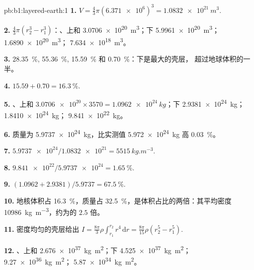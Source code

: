 \begin{solution}{pb:b1:layered-earth:1}
\textbf{1.} $V = \tfrac43\pi(\num{6.371e6})^3 = \qty{1.0832e21}{m^3}$.

\textbf{2.} $\tfrac43\pi(r_2^3 - r_1^3)$：、上和
\qty{3.0706e20}{m^3}；下 \qty{5.9961e20}{m^3}；
\qty{1.6890e20}{m^3}； \qty{7.634e18}{m^3}。

\textbf{3.} \qty{28.35}{\percent}, \qty{55.36}{\percent}, \qty{15.59}{\percent}
和 \qty{0.70}{\percent}：下是最大的壳层，
超过地球体积的一半。

\textbf{4.} $15.59 + 0.70 = \qty{16.3}{\percent}$.

\textbf{5.} 、上和 $\num{3.0706e20}\times3570 =
\qty{1.0962e24}{kg}$；下 \qty{2.9381e24}{kg}；
\qty{1.8410e24}{kg}； \qty{9.841e22}{kg}。

\textbf{6.} 质量为 \qty{5.9737e24}{kg}，比实测值
\qty{5.972e24}{kg} 高 \qty{0.03}{\percent}。

\textbf{7.} $\num{5.9737e24}/\num{1.0832e21} = \qty{5515}{kg.m^{-3}}$.

\textbf{8.} $\num{9.841e22}/\num{5.9737e24} = \qty{1.65}{\percent}$.

\textbf{9.} $(1.0962 + 2.9381)/5.9737 = \qty{67.5}{\percent}$.

\textbf{10.} 地核体积占 \qty{16.3}{\percent}，质量占
\qty{32.5}{\percent}，是体积占比的两倍：其平均密度
\qty{10986}{kg.m^{-3}}，约为的 $2.5$ 倍。

\textbf{11.} 密度均匀的壳层给出
$I = \tfrac{8\pi}{3}\rho\int_{r_1}^{r_2} r^4\,\mathrm dr = \tfrac{8\pi}{15}\rho
(r_2^5 - r_1^5)$.

\textbf{12.} 、上和 \qty{2.676e37}{kg.m^2}；下
\qty{4.525e37}{kg.m^2}； \qty{9.27e36}{kg.m^2}；
\qty{5.87e34}{kg.m^2}。


\end{solution}

